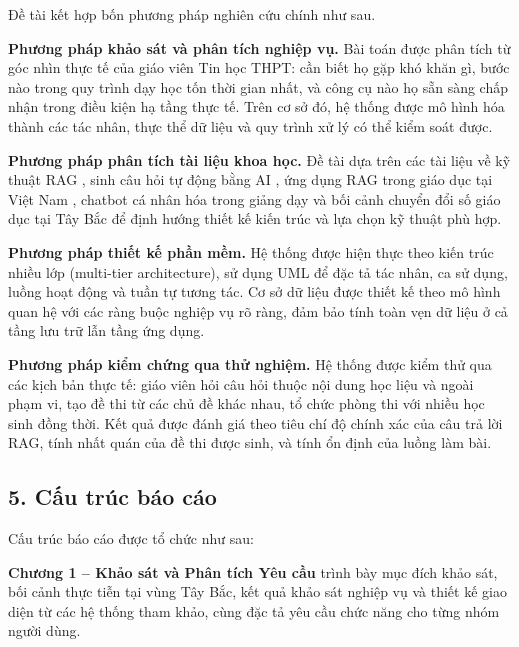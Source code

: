 \documentclass[12pt,a4paper]{article}
\begin{document}
	Đề tài kết hợp bốn phương pháp nghiên cứu chính như sau.
	
	\textbf{Phương pháp khảo sát và phân tích nghiệp vụ.} Bài toán được phân tích từ góc nhìn thực tế của giáo viên Tin học THPT: cần biết họ gặp khó khăn gì, bước nào trong quy trình dạy học tốn thời gian nhất, và công cụ nào họ sẵn sàng chấp nhận trong điều kiện hạ tầng thực tế. Trên cơ sở đó, hệ thống được mô hình hóa thành các tác nhân, thực thể dữ liệu và quy trình xử lý có thể kiểm soát được.
	
	\textbf{Phương pháp phân tích tài liệu khoa học.} Đề tài dựa trên các tài liệu về kỹ thuật RAG \cite{lewis2020rag}, sinh câu hỏi tự động bằng AI \cite{kurdi2020qg}, ứng dụng RAG trong giáo dục tại Việt Nam \cite{nguyen2025rag}, chatbot cá nhân hóa trong giảng dạy \cite{kav2024} và bối cảnh chuyển đổi số giáo dục tại Tây Bắc \cite{baolao2023, gdtd2025} để định hướng thiết kế kiến trúc và lựa chọn kỹ thuật phù hợp.
	
	\textbf{Phương pháp thiết kế phần mềm.} Hệ thống được hiện thực theo kiến trúc nhiều lớp (multi-tier architecture), sử dụng UML để đặc tả tác nhân, ca sử dụng, luồng hoạt động và tuần tự tương tác. Cơ sở dữ liệu được thiết kế theo mô hình quan hệ với các ràng buộc nghiệp vụ rõ ràng, đảm bảo tính toàn vẹn dữ liệu ở cả tầng lưu trữ lẫn tầng ứng dụng.
	
	\textbf{Phương pháp kiểm chứng qua thử nghiệm.} Hệ thống được kiểm thử qua các kịch bản thực tế: giáo viên hỏi câu hỏi thuộc nội dung học liệu và ngoài phạm vi, tạo đề thi từ các chủ đề khác nhau, tổ chức phòng thi với nhiều học sinh đồng thời. Kết quả được đánh giá theo tiêu chí độ chính xác của câu trả lời RAG, tính nhất quán của đề thi được sinh, và tính ổn định của luồng làm bài.
	
	\subsection*{5. Cấu trúc báo cáo}
	
	Cấu trúc báo cáo được tổ chức như sau:
	
	\textbf{Chương 1 -- Khảo sát và Phân tích Yêu cầu} trình bày mục đích khảo sát, bối cảnh thực tiễn tại vùng Tây Bắc, kết quả khảo sát nghiệp vụ và thiết kế giao diện từ các hệ thống tham khảo, cùng đặc tả yêu cầu chức năng cho từng nhóm người dùng.
	
\end{document}
